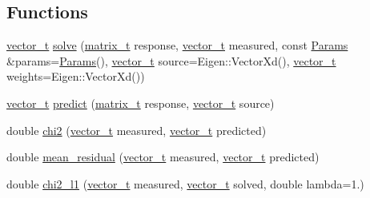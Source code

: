 \subsection*{Functions}
\begin{DoxyCompactItemize}
\item 
\hyperlink{namespace_wire_cell_1_1_ress_a4f1e55ff97c04ad9ff5530f3f5e8c453}{vector\+\_\+t} \hyperlink{namespace_wire_cell_1_1_ress_adfe5a11064a23319b6204e6af6a72cfd}{solve} (\hyperlink{namespace_wire_cell_1_1_ress_a42b8962e4f04a1258a3393990acda985}{matrix\+\_\+t} response, \hyperlink{namespace_wire_cell_1_1_ress_a4f1e55ff97c04ad9ff5530f3f5e8c453}{vector\+\_\+t} measured, const \hyperlink{struct_wire_cell_1_1_ress_1_1_params}{Params} \&params=\hyperlink{struct_wire_cell_1_1_ress_1_1_params}{Params}(), \hyperlink{namespace_wire_cell_1_1_ress_a4f1e55ff97c04ad9ff5530f3f5e8c453}{vector\+\_\+t} source=Eigen\+::\+Vector\+Xd(), \hyperlink{namespace_wire_cell_1_1_ress_a4f1e55ff97c04ad9ff5530f3f5e8c453}{vector\+\_\+t} weights=Eigen\+::\+Vector\+Xd())
\item 
\hyperlink{namespace_wire_cell_1_1_ress_a4f1e55ff97c04ad9ff5530f3f5e8c453}{vector\+\_\+t} \hyperlink{namespace_wire_cell_1_1_ress_a367c0a2adb4a51f64136adbb2363a6c9}{predict} (\hyperlink{namespace_wire_cell_1_1_ress_a42b8962e4f04a1258a3393990acda985}{matrix\+\_\+t} response, \hyperlink{namespace_wire_cell_1_1_ress_a4f1e55ff97c04ad9ff5530f3f5e8c453}{vector\+\_\+t} source)
\item 
double \hyperlink{namespace_wire_cell_1_1_ress_a65a0dc2747ac88cca0e776420c9dc8b1}{chi2} (\hyperlink{namespace_wire_cell_1_1_ress_a4f1e55ff97c04ad9ff5530f3f5e8c453}{vector\+\_\+t} measured, \hyperlink{namespace_wire_cell_1_1_ress_a4f1e55ff97c04ad9ff5530f3f5e8c453}{vector\+\_\+t} predicted)
\item 
double \hyperlink{namespace_wire_cell_1_1_ress_a649d5fb1892afac9f20fde57b9c93382}{mean\+\_\+residual} (\hyperlink{namespace_wire_cell_1_1_ress_a4f1e55ff97c04ad9ff5530f3f5e8c453}{vector\+\_\+t} measured, \hyperlink{namespace_wire_cell_1_1_ress_a4f1e55ff97c04ad9ff5530f3f5e8c453}{vector\+\_\+t} predicted)
\item 
double \hyperlink{namespace_wire_cell_1_1_ress_a0f6f8764e96a080b10c03f7432fe9bba}{chi2\+\_\+l1} (\hyperlink{namespace_wire_cell_1_1_ress_a4f1e55ff97c04ad9ff5530f3f5e8c453}{vector\+\_\+t} measured, \hyperlink{namespace_wire_cell_1_1_ress_a4f1e55ff97c04ad9ff5530f3f5e8c453}{vector\+\_\+t} solved, double lambda=1.)
\end{DoxyCompactItemize}


